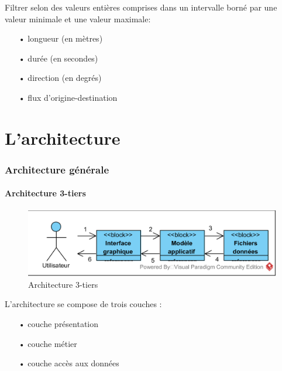 \documentclass[12pt]{article}
\begin{document}
		Filtrer selon des valeurs entières comprises dans un intervalle borné par une
		valeur minimale et une valeur maximale:
		\begin{itemize}
			\item[•]longueur (en mètres)
			\item[•]durée (en secondes)
			\item[•]direction (en degrés)
			\item[•]flux d’origine-destination
		\end{itemize}

\newpage
\part{L'architecture}

	\section{Architecture générale}
		\subsection{Architecture 3-tiers}
		\begin{figure}[!h]
		\begin{center}
		\includegraphics[scale=1]{dia_block_3tiers.png}
		\caption{Architecture 3-tiers}
		\end{center}
		\end{figure}
		
		L’architecture se compose de trois couches :
		\begin{itemize}
			\item[•]couche présentation
			\item[•]couche métier 
			\item[•]couche accès aux données\\
		\end{itemize}
			
\end{document}
